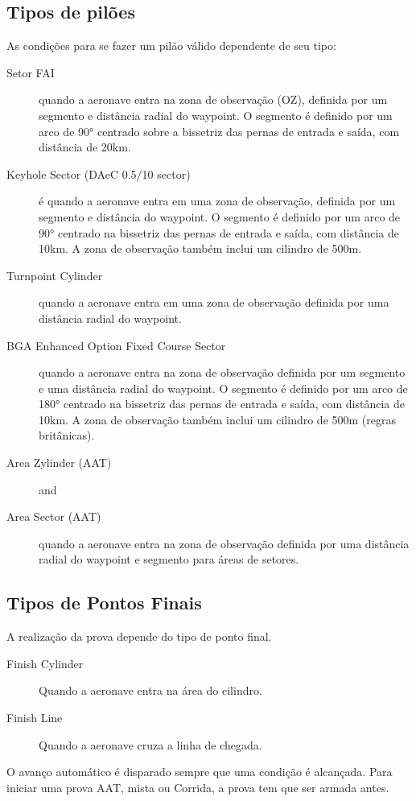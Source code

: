 \subsection*{Tipos de pilões}
As condições para se fazer um pilão válido dependente de seu tipo:
\begin{description}
\item[Setor FAI] quando a aeronave entra na zona de observação (OZ), definida por um segmento e distância radial do waypoint.  O segmento é definido por um arco de 90° centrado sobre a bissetriz das pernas de entrada e saída, com distância de 20km.  
\item[Keyhole Sector (DAeC 0.5/10 sector)] é quando a aeronave entra em uma zona de observação, definida por um segmento e distância do waypoint. O segmento é definido por um arco de 90° centrado na bissetriz das pernas de entrada e saída, com distância de 10km.  A zona de observação também inclui um cilindro de 500m.
\item[Turnpoint Cylinder]  quando a aeronave entra em uma zona de observação definida por uma distância radial do waypoint.
\item[BGA Enhanced Option Fixed Course Sector]  quando a aeronave entra na zona de observação definida por um segmento e uma distância radial do waypoint.  O segmento é definido por um arco de 180° centrado na bissetriz das pernas de entrada e saída, com distância de 10km.  A zona de observação também inclui um cilindro de 500m (regras britânicas).
\item[Area Zylinder (AAT)]  and
\item[Area Sector (AAT)]  quando a aeronave entra na zona de observação definida por uma distância radial do waypoint e segmento para áreas de setores.

\end{description}

\subsection*{Tipos de Pontos Finais}
A realização da prova depende do tipo de ponto final.
\begin{description}
\item[Finish Cylinder] Quando a aeronave entra na área do cilindro.
\item[Finish Line] Quando a aeronave cruza a linha de chegada.
\end{description}

O avanço automático é disparado sempre que uma condição é alcançada.  Para iniciar uma prova AAT, mista ou Corrida, a prova tem que ser armada antes.

